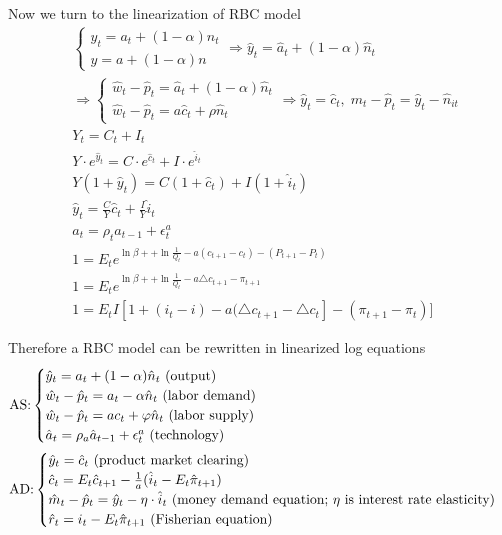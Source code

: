 \documentclass{article}
\begin{document}
Now we turn to the linearization of RBC model
\begin{align}
&
\begin{cases}
y_{t}=a_{t}+(1-\alpha)n_{t}
\\
y=a+(1-\alpha)n
\end{cases}
\Rightarrow \hat y_{t}=\hat a_{t}+(1-\alpha)\hat n_{t}
\\&
\Rightarrow 
\begin{cases}
\hat w_{t}-\hat p_{t}=\hat a_{t}+(1-\alpha)\hat n_{t} \\
\hat w_{t}-\hat p_{t}=a\hat c_{t}+\rho \hat n_{t}\end{cases}
\Rightarrow \hat y_{t}=\hat c_{t}, \; m_{t}-\hat p_{t}=\hat y_{t} -\hat n_{it}
\\&
Y_{t}=C_{t}+I_{t}
\\&
Y\cdot e^{\hat y_{t}}=C\cdot e^{\hat c_{t}}+I\cdot e^{\hat i_{t}}
\\&
Y(1+\hat y_{t})=C(1+\hat c_{t})+I(1+\hat i_{t})
\\&
\hat y_{t}=\frac{C}{Y}\hat c_{t}+ \frac{I}{Y} \hat i_{t}\\&
a_{t}=\rho_{t} a_{t-1}+\epsilon_{t}^{a}
\\&
1=E_{t} e^{\ln \beta + +\ln \frac{1}{Q_{t}}-a(c_{t+1}-c_{t})-(P_{t+1}-P_{t})}
\\&
1=E_{t} e^{\ln \beta + +\ln \frac{1}{Q_{t}}-a\triangle c_{t+1}-\pi_{t+1}}
\\&
1=E_{t} I[1+(i_{t}-i)-a(\triangle c_{t+1}-\triangle c_{t}]-(\pi_{t+1}-\pi_{t})]
\end{align}

{\color{red} Therefore a RBC model can be rewritten in linearized log equations
\begin{align}
\color{red}&\text{AS:} \begin{cases}
\hat y_{t}=a_{t}+(1-\alpha)\hat n_{t} \text{ (output)}\\
\hat w_{t}-\hat p_{t}=a_{t}-\alpha \hat n_{t} \text{ (labor demand)}\\
\hat w_{t}-\hat p_{t}=a c_{t}+\varphi \hat n_{t} \text{ (labor supply)}\\
\hat a_{t}=\rho_a \hat a_{t-1}+\epsilon_t^a \text{ (technology)}
\end{cases} 
\\&
\text{AD:} \begin{cases}
\hat y_{t}=\hat c_{t} \text{ (product market clearing)}\\
\hat c_{t}=E_{t}\hat c_{t+1}-\frac{1}{a}(\hat i_{t}-E_{t}\hat \pi_{t+1}) \\
\hat m_{t}-\hat p_{t}=\hat y_{t}-\eta \cdot \hat i_{t} \text{ (money demand equation; $\eta$ is interest rate elasticity)}\\
\hat r_{t}=i_{t}-E_{t} \hat \pi_{t+1} \text{ (Fisherian equation)}
\end{cases}
\end{align}
}
\end{document}

